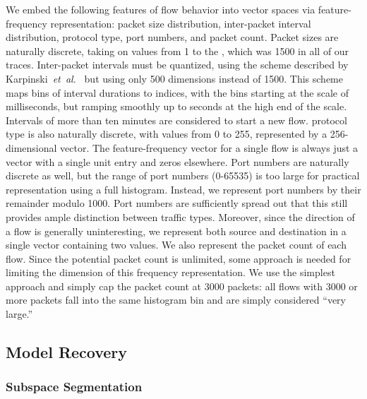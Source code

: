 \documentclass[conference]{IEEEtran}
\begin{document}
We embed the following features of flow behavior into vector spaces via feature-frequency representation:
packet size distribution,
inter-packet interval distribution,
 protocol type,
 port numbers,
and packet count.
%
Packet sizes are naturally discrete, taking on values from 1 to the , which was 1500 in all of our traces.
%
Inter-packet intervals must be quantized, using the scheme described by Karpinski~\emph{et~al.}~\cite{Karpinski08} but using only 500 dimensions instead of 1500.
This scheme maps bins of interval durations to indices, with the bins starting at the scale of milliseconds, but ramping smoothly up to seconds at the high end of the scale.
Intervals of more than ten minutes are considered to start a new flow.
%
 protocol type is also naturally discrete, with values from 0 to 255, represented by a 256-dimensional vector.
The feature-frequency vector for a single flow is always just a vector with a single unit entry and zeros elsewhere.
%
Port numbers are naturally discrete as well, but the range of port numbers (0-65535) is too large for practical representation using a full histogram.
Instead, we represent port numbers by their remainder modulo 1000.
Port numbers are sufficiently spread out that this still provides ample distinction between traffic types.
Moreover, since the direction of a flow is generally uninteresting, we represent both source and destination in a single vector containing two values.
%
We also represent the packet count of each flow.
Since the potential packet count is unlimited, some approach is needed for limiting the dimension of this frequency representation.
We use the simplest approach and simply cap the packet count at 3000 packets:
all flows with 3000 or more packets fall into the same histogram bin and are simply considered ``very large.''

\subsection{Model Recovery}

\subsubsection{Subspace Segmentation}
\end{document}
